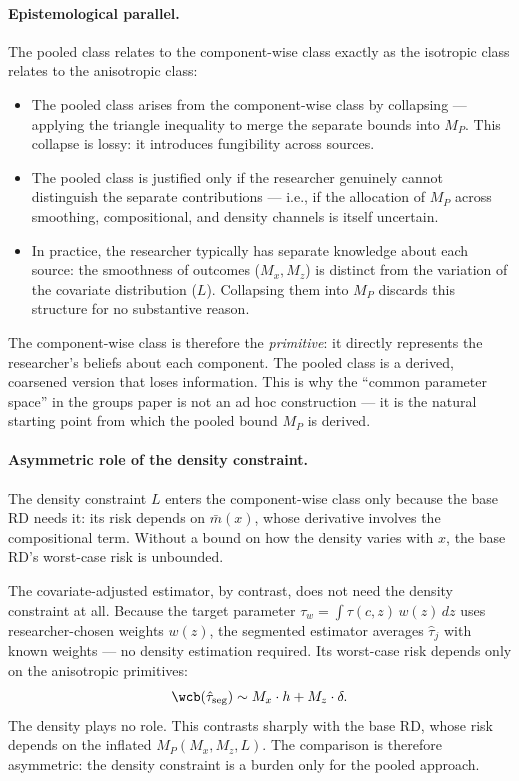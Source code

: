 \paragraph{Epistemological parallel.}
The pooled class relates to the component-wise class exactly as the isotropic class relates to the anisotropic class:
\begin{itemize}
	\item The pooled class arises from the component-wise class by collapsing --- applying the triangle inequality to merge the separate bounds into $M_P$.
	This collapse is lossy: it introduces fungibility across sources.
	\item The pooled class is justified only if the researcher genuinely cannot distinguish the separate contributions --- i.e., if the allocation of $M_P$ across smoothing, compositional, and density channels is itself uncertain.
	\item In practice, the researcher typically has separate knowledge about each source: the smoothness of outcomes ($M_x, M_z$) is distinct from the variation of the covariate distribution ($L$).
	Collapsing them into $M_P$ discards this structure for no substantive reason.
\end{itemize}

The component-wise class is therefore the \emph{primitive}: it directly represents the researcher's beliefs about each component.
The pooled class is a derived, coarsened version that loses information.
This is why the ``common parameter space'' in the groups paper is not an ad hoc construction --- it is the natural starting point from which the pooled bound $M_P$ is derived.


\paragraph{Asymmetric role of the density constraint.}
The density constraint $L$ enters the component-wise class only because the base RD needs it: its risk depends on $\bar{m}(x)$, whose derivative involves the compositional term.
Without a bound on how the density varies with $x$, the base RD's worst-case risk is unbounded.

The covariate-adjusted estimator, by contrast, does not need the density constraint at all.
Because the target parameter $\tau_w = \int \tau(c,z)\, w(z)\, dz$ uses researcher-chosen weights $w(z)$, the segmented estimator averages $\hat\tau_j$ with known weights --- no density estimation required.
Its worst-case risk depends only on the anisotropic primitives:
\begin{equation*}
	\wcb(\hat\tau_{\mathrm{seg}}) \sim M_x \cdot h + M_z \cdot \delta.
\end{equation*}
The density plays no role.
This contrasts sharply with the base RD, whose risk depends on the inflated $M_P(M_x, M_z, L)$.
The comparison is therefore asymmetric: the density constraint is a burden only for the pooled approach.

